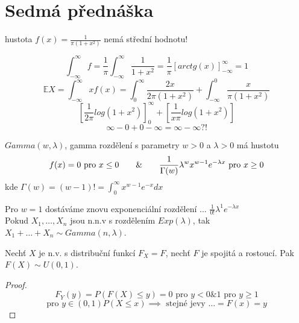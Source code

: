 \documentclass[../main.tex]{subfiles}
\begin{document}
\section{Sedmá přednáška}


\begin{definition}

    hustota $f(x) = \frac{1}{\pi (1+x^2)}$
    nemá střední hodnotu!

    \begin{remark}
        \[\int^\infty_{-\infty} f = \frac{1}{\pi} \int^\infty_{-\infty} \frac{1}{1+x^2} = \frac{1}{\pi}\left[arctg(x)\right]^\infty_{-\infty} = 1\]
        \[\mathbb{E}X = \int^\infty_{-\infty} x f(x) = \int^\infty_0 \frac{2x}{2\pi (1+x^2)} + \int^0_{-\infty}\frac{x}{\pi (1+x^2)}\]
        \[\left[\frac{1}{2\pi}log(1+x^2)\right]^\infty_0 + \left[\frac{1}{x\pi} log(1+x^2)\right]\]
        \[\infty - 0 + 0- \infty = \infty - \infty ?!\]
    \end{remark}
    
\end{definition}

\begin{definition} 

    $Gamma(w,\lambda)$, gamma rozdělení s parametry $w > 0$ a $\lambda > 0$ má hustotu
    \[f(x) = 0 \text{ pro } x \leq 0 \hspace{7mm} \& \hspace{7mm} \frac{1}{\Gamma(w)}\lambda^w x^{w-1} e^{-\lambda x} \text{ pro } x\geq 0\]
    kde $\Gamma(w) = (w-1)! = \int^\infty_0 x^{w-1}e^{-x}dx$

    Pro $w = 1$ dostáváme znovu exponenciální rozdělení ... $\frac{1}{0!}\lambda^1 e^{-\lambda x}$\\
    Pokud $X_1,\dots ,X_n$ jsou n.n.v s rozdělením $Exp(\lambda)$, tak $X_1 + \dots + X_n \sim Gamma(n, \lambda)$.  
\end{definition}
\begin{theorem}
    Nechť $X$ je n.v. s distribuční funkcí $F_X = F$, nechť $F$ je spojitá a rostoucí. Pak $F(X) \sim U(0,1)$.\\
    
    \begin{proof}
        \[F_Y(y) = P(F(X) \leq y) = 0 \text{ pro } y < 0 \& 1 \text{ pro } y \geq 1\]
        \[\text{pro } y \in (0,1) P(X \leq x) \implies \text{ stejné jevy } \dots = F(x) = y\]
    \end{proof}
\end{theorem}
\end{document}
